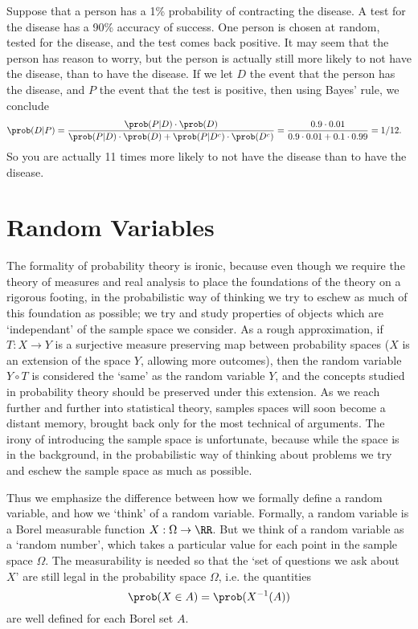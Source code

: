 \begin{example}
    Suppose that a person has a 1\% probability of contracting the disease. A test for the disease has a 90\% accuracy of success. One person is chosen at random, tested for the disease, and the test comes back positive. It may seem that the person has reason to worry, but the person is actually still more likely to not have the disease, than to have the disease. If we let $D$ the event that the person has the disease, and $P$ the event that the test is positive, then using Bayes' rule, we conclude
    \begin{align*}
        \prob(D | P) &= \frac{\prob(P|D) \cdot \prob(D)}{\prob(P|D) \cdot \prob(D) + \prob(P|D^c) \cdot \prob(D^c)} = \frac{0.9 \cdot 0.01}{0.9 \cdot 0.01 + 0.1 \cdot 0.99} = 1/12.
    \end{align*}
    So you are actually 11 times more likely to not have the disease than to have the disease.
\end{example}


\chapter{Random Variables}

The formality of probability theory is ironic, because even though we require the theory of measures and real analysis to place the foundations of the theory on a rigorous footing, in the probabilistic way of thinking we try to eschew as much of this foundation as possible; we try and study properties of objects which are `independant' of the sample space we consider. As a rough approximation, if $T: X \to Y$ is a surjective measure preserving map between probability spaces ($X$ is an extension of the space $Y$, allowing more outcomes), then the random variable $Y \circ T$ is considered the `same' as the random variable $Y$, and the concepts studied in probability theory should be preserved under this extension. As we reach further and further into statistical theory, samples spaces will soon become a distant memory, brought back only for the most technical of arguments. The irony of introducing the sample space is unfortunate, because while the space is in the background, in the probabilistic way of thinking about problems we try and eschew the sample space as much as possible.

Thus we emphasize the difference between how we formally define a random variable, and how we `think' of a random variable. Formally, a random variable is a Borel measurable function $X: \Omega \to \RR$. But we think of a random variable as a `random number', which takes a particular value for each point in the sample space $\Omega$. The measurability is needed so that the `set of questions we ask about $X$' are still legal in the probability space $\Omega$, i.e. the quantities
%
\[ \prob(X \in A) = \prob(X^{-1}(A)) \]
%
are well defined for each Borel set $A$.

